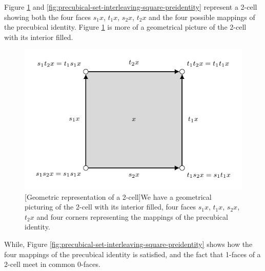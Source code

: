     Figure \ref{fig:precubical-set-interleaving-square-geometric} and \ref{fig:precubical-set-interleaving-square-preidentity} represent a 2-cell showing both the four faces $s_1 x$, $t_1 x$, $s_2 x$, $t_2 x$ and the four possible mappings of the precubical identity. Figure \ref{fig:precubical-set-interleaving-square-geometric} is more of a geometrical picture of the 2-cell with its interior filled.
    
    \begin{figure}[ht]
        \centering
        \includegraphics[scale=1.2]{Figures/3.An-introduction-to-non-interleaving-models-for-concurrency/precubical-square/cubical-law-2-cell-geometrical.pdf}
         [Geometric representation of a 2-cell]{We have a geometrical picturing of the 2-cell with its interior filled, four faces $s_1 x$, $t_1 x$, $s_2 x$, $t_2 x$ and four corners representing the mappings of the precubical identity.}
        \label{fig:precubical-set-interleaving-square-geometric}
    \end{figure}
    
    While, Figure \ref{fig:precubical-set-interleaving-square-preidentity} shows how the four mappings of the precubical identity is satisfied, and the fact that 1-faces of a 2-cell meet in common 0-faces.
    
